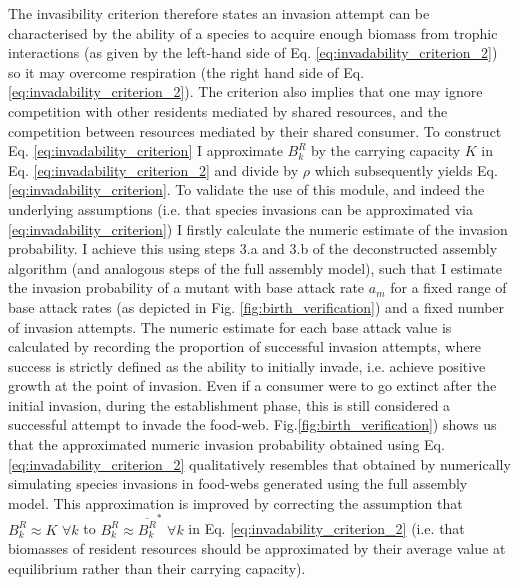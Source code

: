 \documentclass[a4paper]{report}
\begin{document}
The invasibility criterion therefore states an invasion attempt can be characterised by the ability of a species to acquire enough biomass from trophic interactions (as given by the left-hand side of Eq. \eqref{eq:invadability_criterion_2}) so it may overcome respiration (the right hand side of Eq. \eqref{eq:invadability_criterion_2}). The criterion also implies that one may ignore competition with other residents mediated by shared resources, and the competition between resources mediated by their shared consumer. To construct Eq. \eqref{eq:invadability_criterion} I approximate $B_{k}^{R}$ by the carrying capacity $K$ in Eq. \eqref{eq:invadability_criterion_2} and divide by $\rho$ which subsequently yields Eq.  \eqref{eq:invadability_criterion}. To validate the use of this module, and indeed the underlying assumptions (i.e. that species invasions can be approximated via \eqref{eq:invadability_criterion}) I firstly calculate the numeric estimate of the invasion probability. I achieve this using steps 3.a and 3.b of the deconstructed assembly algorithm (and analogous steps of the full assembly model), such that I estimate the invasion probability of a mutant with base attack rate $a_m$ for a fixed range of base attack rates (as depicted in Fig.  \ref{fig:birth_verification}) and a fixed number of invasion attempts. The numeric estimate for each base attack value is calculated by recording the proportion of successful invasion attempts, where success is strictly defined as the ability to initially invade, i.e. achieve positive growth at the point of invasion. Even if a consumer were to go extinct after the initial invasion, during the establishment phase, this is still considered a successful attempt to invade the food-web. Fig.\ref{fig:birth_verification}) shows us that the approximated numeric invasion probability obtained using Eq. \eqref{eq:invadability_criterion_2} qualitatively resembles that obtained by numerically simulating species invasions in food-webs generated using the full assembly model. This approximation is improved by correcting the assumption that $B_{k}^{R} \approx K$ $\forall k$ to $B_{k}^{R} \approx \overline{B_{k}^{R}}^{*}$ $\forall k$ in Eq. \eqref{eq:invadability_criterion_2} (i.e. that biomasses of resident resources should be approximated by their average value at equilibrium rather than their carrying capacity). \\
\end{document}
